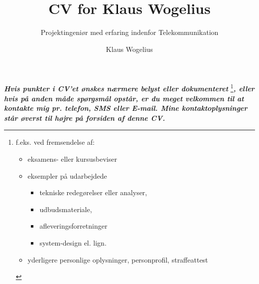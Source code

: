 \documentclass[10pt,twoside,a4paper]{curve} %
\title{CV for Klaus Wogelius}
\subtitle{Projektingeniør med erfaring indenfor Telekommunikation}
\author{Klaus Wogelius}
\begin{document}
\makeheaders 
\maketitle
{}
\pagebreak
{}
\vfill %
\textbf{\textit{Hvis punkter i CV'et ønskes nærmere belyst eller dokumenteret}}
\footnote{
f.eks. ved fremsendelse af:
\begin{itemize}
\item eksamens- eller kursusbeviser
\item eksempler på udarbejdede 
\begin{itemize}
\item tekniske redegørelser eller analyser,
\item udbudsmateriale,
\item afleveringsforretninger
\item system-design el. lign.
\end{itemize}
\item yderligere personlige oplysninger, personprofil, straffeattest
\end{itemize}
}\textbf{\textit{, eller hvis på anden måde spørgsmål opstår, er du meget velkommen til at kontakte mig pr. telefon, SMS eller E-mail. Mine kontaktoplysninger står øverst til højre på forsiden af denne CV.}}
\vspace{10mm}
%
%
\end{document}
